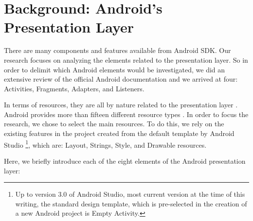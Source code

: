 \section{Background: Android's Presentation Layer}

There are many components and features available from Android \acs{SDK}. Our research focuses on analyzing the elements related to the presentation layer. So in order to delimit which Android elements would be investigated,
we did an extensive review of the official Android documentation \cite{AndroidDeveloperSite2016} and we arrived at four: Activities, Fragments, Adapters, and Listeners.

In terms of resources, they are all by nature related to the presentation layer \cite{AndroidFundamentals}. Android provides more than fifteen different resource types \cite{AndroidResourceType}. In order to focus the research, we chose to select the main resources. To do this, we rely on the existing features in the project created from the default template by Android Studio \cite{FirstApp2017} \footnote{Up to version 3.0 of Android Studio, most current version at the time of this writing, the standard design template, which is pre-selected in the creation of a new Android project is Empty Activity.}, which are: Layout, Strings, Style, and Drawable resources.

Here, we briefly introduce each of the eight elements of the Android presentation layer:

